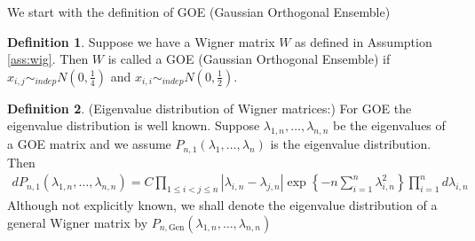 \documentclass[12pt]{article}
\numberwithin{equation}{section}
\numberwithin{equation}{section}
\theoremstyle{definition}
\newtheorem{definition}{Definition}[section]
\renewcommand{\1}{\bf 1}
\begin{document}
\noindent 
We start with the definition of GOE (Gaussian Orthogonal Ensemble)
\begin{definition}
Suppose we have a Wigner matrix $W$ as defined in Assumption \ref{ass:wig}. Then $W$ is called a GOE (Gaussian Orthogonal Ensemble) if $x_{i,j} \sim_{indep} N(0,\frac{1}{4})$ and $x_{i,i} \sim_{indep} N(0,\frac{1}{2})$.
\end{definition}

\noindent
\begin{definition}(Eigenvalue distribution of Wigner matrices:)
For GOE the eigenvalue distribution is well known. Suppose $\lambda_{1,n},\ldots , \lambda_{n,n}$ be the eigenvalues of a GOE matrix and we assume $P_{n,1}(\lambda_{1},\ldots, \lambda_{n})$ is the eigenvalue distribution. Then 
\begin{equation}\label{eq:GOEeigen}
\begin{split}
dP_{n,1}\left( \lambda_{1,n},\ldots, \lambda_{n,n} \right)= C \prod_{1\le i < j \le n} \left|\lambda_{i,n} - \lambda_{j,n} \right|\exp\left\{ - n \sum_{i=1}^{n} \lambda_{i,n}^2 \right\}\prod_{i=1}^{n}d\lambda_{i,n}
\end{split}
\end{equation}
Although not explicitly known, we shall denote the eigenvalue distribution of a general Wigner matrix by $P_{n,\mathrm{Gen}}(\lambda_{1,n},\ldots, \lambda_{n,n})$
\end{definition}
\end{document}
